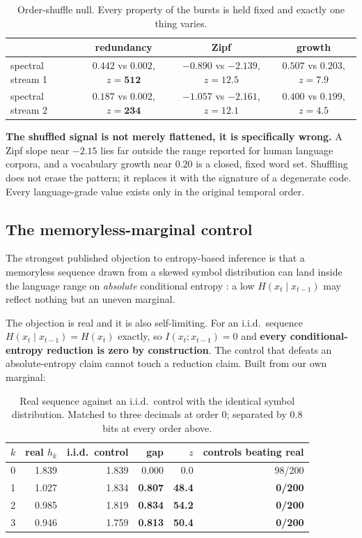 \documentclass[11pt,a4paper]{article}
\newcommand{\bnum}[1]{\textbf{#1}}
\begin{document}
\begin{table}[htbp]
\centering
\caption{Order-shuffle null. Every property of the bursts is held fixed and exactly one
thing varies.}
\label{tab:shuffle}
\small
\begin{tabular}{lccc}
\toprule
 & redundancy & Zipf & growth \\
\midrule
spectral stream 1 & $0.442$ vs $0.002$, $z = \mathbf{512}$
                 & $-0.890$ vs $-2.139$, $z = \mathbf{12.5}$
                 & $0.507$ vs $0.203$, $z = \mathbf{7.9}$ \\
spectral stream 2 & $0.187$ vs $0.002$, $z = \mathbf{234}$
                 & $-1.057$ vs $-2.161$, $z = \mathbf{12.1}$
                 & $0.400$ vs $0.199$, $z = \mathbf{4.5}$ \\
\bottomrule
\end{tabular}
\end{table}

\textbf{The shuffled signal is not merely flattened, it is specifically wrong.} A Zipf
slope near $-2.15$ lies far outside the range reported for human language corpora, and a
vocabulary growth near $0.20$ is a closed, fixed word set. Shuffling does not erase the
pattern; it replaces it with the signature of a degenerate code. Every language-grade
value exists only in the original temporal order.

\subsection{The memoryless-marginal control}
\label{sec:memoryless}

The strongest published objection to entropy-based inference is that a memoryless
sequence drawn from a skewed symbol distribution can land inside the language range on
\emph{absolute} conditional entropy \cite{sproat2014}: a low $H(x_t \mid x_{t-1})$ may
reflect nothing but an uneven marginal.

The objection is real and it is also self-limiting. For an i.i.d.\ sequence
$H(x_t \mid x_{t-1}) = H(x_t)$ exactly, so $I(x_t; x_{t-1}) = 0$ and \textbf{every
conditional-entropy reduction is zero by construction}. The control that defeats an
absolute-entropy claim cannot touch a reduction claim. Built from our own marginal:

\begin{table}[htbp]
\centering
\caption{Real sequence against an i.i.d.\ control with the identical symbol
distribution. Matched to three decimals at order 0; separated by 0.8 bits at every order
above.}
\label{tab:memoryless}
\begin{tabular}{rrrrrr}
\toprule
$k$ & real $h_k$ & i.i.d.\ control & \bnum{gap} & $z$ & controls beating real \\
\midrule
0 & 1.839 & 1.839 & 0.000 & 0.0 & 98/200 \\
1 & 1.027 & 1.834 & \bnum{0.807} & \bnum{48.4} & \bnum{0/200} \\
2 & 0.985 & 1.819 & \bnum{0.834} & \bnum{54.2} & \bnum{0/200} \\
3 & 0.946 & 1.759 & \bnum{0.813} & \bnum{50.4} & \bnum{0/200} \\
\bottomrule
\end{tabular}
\end{table}
\end{document}
